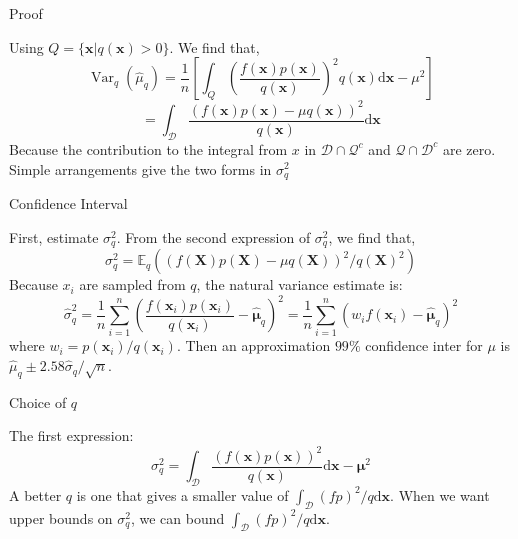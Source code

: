 \begin{frame}{Proof}

Using $Q=\{\boldsymbol{x} | q(\boldsymbol{x})>0\}$. We find that,\\
\[\operatorname{Var}_{q}\left(\hat{\mu}_{q}\right)=\frac{1}{n}\left[\int_{Q}\left(\frac{f(\boldsymbol{x}) p(\boldsymbol{x})}{q(\boldsymbol{x})}\right)^{2} q(\boldsymbol{x}) \mathrm{d} \boldsymbol{x}-\mu^{2}\right]\]
\[=\int_{\mathcal{D}} \frac{(f(\boldsymbol{x}) p(\boldsymbol{x})-\mu q(\boldsymbol{x}))^{2}}{q(\boldsymbol{x})} \mathrm{d} \boldsymbol{x}\]
Because the contribution to the integral from $x$ in $\mathcal{D} \cap \mathcal{Q}^{c}$ and $\mathcal{Q} \cap \mathcal{D}^{c}$ are zero. Simple arrangements give the two forms in $\sigma_{q}^{2}$\\


\end{frame}

\begin{frame}{Confidence Interval}

First, estimate $\sigma_{q}^{2}$. From the second expression of $\sigma_{q}^{2}$, we find that,\\
\[\sigma_{q}^{2}=\mathbb{E}_{q}\left((f(\boldsymbol{X}) p(\boldsymbol{X})-\mu q(\boldsymbol{X}))^{2} / q(\boldsymbol{X})^{2}\right)\]
Because $x_{i}$ are sampled from $q$, the natural variance estimate is:\\
\[\hat{\sigma}_{q}^{2}=\frac{1}{n} \sum_{i=1}^{n}\left(\frac{f\left(\boldsymbol{x}_{i}\right) p\left(\boldsymbol{x}_{i}\right)}{q\left(\boldsymbol{x}_{i}\right)}-\hat{\boldsymbol{\mu}}_{q}\right)^{2}=\frac{1}{n} \sum_{i=1}^{n}\left(w_{i} f\left(\boldsymbol{x}_{i}\right)-\hat{\boldsymbol{\mu}}_{q}\right)^{2}\]
where $w_{i}=p\left(\boldsymbol{x}_{i}\right) / q\left(\boldsymbol{x}_{i}\right)$. Then an approximation $99 \%$ confidence inter for $\mu$ is $\hat{\mu}_{q} \pm 2.58 \hat{\sigma}_{q} / \sqrt{n}$.

\end{frame}

\begin{frame}{Choice of $q$}

The first expression:\\
\[\sigma_{q}^{2}=\int_{\mathcal{D}} \frac{(f(\boldsymbol{x}) p(\boldsymbol{x}))^{2}}{q(\boldsymbol{x})} \mathrm{d} \boldsymbol{x}-\boldsymbol{\mu}^{2}\]
A better $q$ is one that gives a smaller value of $\int_{\mathcal{D}}(f p)^{2} / q \mathrm{d} \boldsymbol{x}$. When we want upper bounds on $\sigma_{q}^{2}$, we can bound $\int_{\mathcal{D}}(f p)^{2} / q \mathrm{d} \boldsymbol{x}$.

\end{frame}


